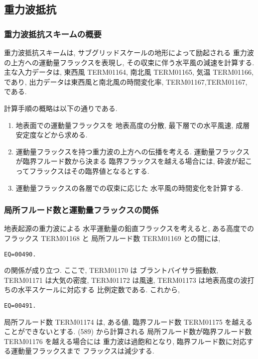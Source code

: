 ﻿
\subsection{重力波抵抗}

\subsubsection{重力波抵抗スキームの概要}

重力波抵抗スキームは,
サブグリッドスケールの地形によって励起される
重力波の上方への運動量フラックスを表現し,
その収束に伴う水平風の減速を計算する.
主な入力データは, 東西風 TERM01164, 南北風 TERM01165, 気温 TERM01166, であり,
出力データは東西風と南北風の時間変化率,
TERM01167,TERM01167, である.

計算手順の概略は以下の通りである.
%
\begin{enumerate}
\item 地表面での運動量フラックスを
      地表高度の分散, 
      最下層での水平風速, 成層安定度などから求める.
\item 運動量フラックスを持つ重力波の上方への伝播を考える.
      運動量フラックスが臨界フルード数から決まる
      臨界フラックスを越える場合には,
      砕波が起こってフラックスはその臨界値となるとする.
\item 運動量フラックスの各層での収束に応じた
      水平風の時間変化を計算する.
\end{enumerate}

\subsubsection{局所フルード数と運動量フラックスの関係}

地表起源の重力波による
水平運動量の鉛直フラックスを考えると,
ある高度でのフラックス TERM01168 と
局所フルード数 TERM01169 との間には,
\begin{verbatim}
EQ=00490.
\end{verbatim}
の関係が成り立つ.
ここで, TERM01170 は
ブラントバイサラ振動数, 
TERM01171 は大気の密度, 
TERM01172 は風速, TERM01173 は地表高度の波打ちの水平スケールに対応する
比例定数である.
これから,
\begin{verbatim}
EQ=00491.
\end{verbatim}

局所フルード数 TERM01174 は,
ある値, 臨界フルード数 TERM01175 を越えることができないとする.
(589) から計算される
局所フルード数が臨界フルード数 TERM01176 を越える場合には
重力波は過飽和となり,
臨界フルード数に対応する運動量フラックスまで
フラックスは減少する.

